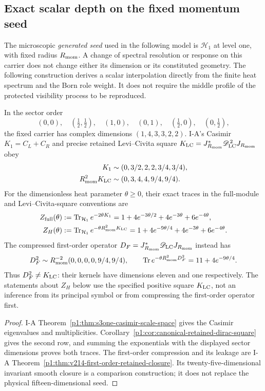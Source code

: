 \documentclass[12pt,a4paper]{article}
\begin{document}
\subsection{Exact scalar depth on the fixed momentum seed}
\label{p3c:sec:v2218-fixed-momentum-depth}

The microscopic \emph{generated seed} used in the following model is
\(\mathcal H_1\) at level one, with fixed radius \(R_{\mathrm{mom}}\). A change of spectral resolution or response on this carrier
does not change either its dimension or its constituted geometry.
The following construction derives a scalar interpolation directly from
the finite heat spectrum and the Born role weight. It does not require
the middle profile of the protected visibility process to be reproduced.

\begin{proposition}
\label{p3c:prop:v2218-fixed-seed-heat-spectra}
In the sector order
\[
 (0,0),\quad(\tfrac12,\tfrac12),\quad(1,0),\quad(0,1),
 \quad(\tfrac12,0),\quad(0,\tfrac12),
\]
the fixed carrier has complex dimensions \((1,4,3,3,2,2)\).
I-A's Casimir \(K_1=C_L+C_R\) and precise retained Levi--Civita
square \(K_{\rm LC}=J_{R_{\mathrm{mom}}}^*\mathscr D_{\rm LC}^{\,2}J_{R_{\mathrm{mom}}}\)
obey
\begin{align}
 K_1&\sim(0,3/2,2,2,3/4,3/4),\nonumber\\
 R_{\mathrm{mom}}^2K_{\rm LC}&\sim(0,3,4,4,9/4,9/4).
 \label{p3c:eq:v2218-fixed-seed-spectra}
\end{align}
For the dimensionless heat parameter \(\theta\ge0\), their exact
traces in the full-module and Levi--Civita-square conventions are
\begin{align}
 Z_{\rm full}(\theta)
 &:=\operatorname{Tr}_{\mathcal H_1}e^{-2\theta K_1}
 =1+4e^{-3\theta/2}+4e^{-3\theta}+6e^{-4\theta},\nonumber\\
 Z_H(\theta)
 &:=\operatorname{Tr}_{\mathcal H_1}e^{-\theta R_{\mathrm{mom}}^2K_{\rm LC}}
 =1+4e^{-9\theta/4}+4e^{-3\theta}+6e^{-4\theta}.
 \label{p3c:eq:v2218-fixed-seed-heat-traces}
\end{align}
The compressed first-order operator
\(D_F=J_{R_{\mathrm{mom}}}^*\mathscr D_{\rm LC}J_{R_{\mathrm{mom}}}\) instead has
\[
 D_F^2\sim R_{\mathrm{mom}}^{-2}(0,0,0,0,9/4,9/4),\qquad
 \operatorname{Tr} e^{-\theta R_{\mathrm{mom}}^2D_F^2}=11+4e^{-9\theta/4}.
\]
Thus \(D_F^2\ne K_{\rm LC}\): their kernels have dimensions eleven
and one respectively. The statements about \(Z_H\) below use the
specified positive square \(K_{\rm LC}\), not an inference from its
principal symbol or from compressing the first-order operator first.
\end{proposition}
\begin{proof}
I-A Theorem~\ref{p1:thm:s3one-casimir-scale-space} gives the Casimir
eigenvalues and multiplicities. Corollary~\ref{p1:cor:canonical-retained-dirac-square}
gives the second row, and summing the exponentials with the displayed
sector dimensions proves both traces. The first-order compression and
its leakage are I-A Theorem~\ref{p1:thm:v214-first-order-retained-closure}.
Its twenty-five-dimensional invariant smooth closure is a comparison
construction; it does not replace the physical fifteen-dimensional seed.
\end{proof}
\end{document}
